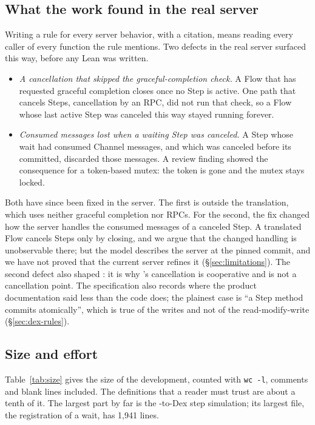 \subsection{What the work found in the real server}
\label{sec:server-bugs}

Writing a rule for every server behavior, with a citation, means reading
every caller of every function the rule mentions. Two defects in the real
server surfaced this way, before any Lean was written.
\begin{itemize}
\item \emph{A cancellation that skipped the graceful-completion check.}
  A Flow that has requested graceful completion closes once no Step is
  active. One path that cancels Steps, cancellation by an RPC, did not run
  that check, so a Flow whose last active Step was canceled this way stayed
  running forever.
\item \emph{Consumed messages lost when a waiting Step was canceled.} A
  Step whose wait had consumed Channel messages, and which was canceled
  before its  committed, discarded those messages. A review
  finding showed the consequence for a token-based mutex: the token is
  gone and the mutex stays locked.
\end{itemize}
Both have since been fixed in the server. The first is outside the
translation, which uses neither graceful completion nor RPCs. For the
second, the fix changed how the server handles the consumed messages of a
canceled Step. A translated Flow cancels Steps only by closing, and we
argue that the changed handling is unobservable there; but the model
describes the server at the pinned commit, and we have not proved that
the current server refines it (\S\ref{sec:limitations}). The second defect
also shaped \Lang{}: it is why \Lang{}'s cancellation is cooperative and
 is not a cancellation point. The
specification also records where the product documentation said less than
the code does; the plainest case is ``a Step method commits atomically'',
which is true of the writes and not of the read-modify-write
(\S\ref{sec:dex-rules}).

\subsection{Size and effort}
\label{sec:size}

Table~\ref{tab:size} gives the size of the development, counted with
\texttt{wc -l}, comments and blank lines included. The definitions that a
reader must trust are about a tenth of it. The largest part by far is the
\Lang{}-to-Dex step simulation; its largest file, the registration of a
wait, has 1,941 lines.

